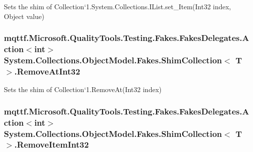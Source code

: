 Sets the shim of Collection`1.System.\-Collections.\-I\-List.\-set\-\_\-\-Item(\-Int32 index, Object value)

\hypertarget{class_system_1_1_collections_1_1_object_model_1_1_fakes_1_1_shim_collection_3_01_t_01_4_a9dd09b8943ad528b18131c8c9b4e5233}{
\subsubsection[{Remove\-At\-Int32}]{\setlength{\rightskip}{0pt plus 5cm}mqttf.\-Microsoft.\-Quality\-Tools.\-Testing.\-Fakes.\-Fakes\-Delegates.\-Action$<$int$>$ System.\-Collections.\-Object\-Model.\-Fakes.\-Shim\-Collection$<$ T $>$.Remove\-At\-Int32\hspace{0.3cm}{\ttfamily [set]}}}\label{class_system_1_1_collections_1_1_object_model_1_1_fakes_1_1_shim_collection_3_01_t_01_4_a9dd09b8943ad528b18131c8c9b4e5233}


Sets the shim of Collection`1.Remove\-At(\-Int32 index)

\hypertarget{class_system_1_1_collections_1_1_object_model_1_1_fakes_1_1_shim_collection_3_01_t_01_4_a400eb171d8deaf9d1f1ec61c344d14de}{
\subsubsection[{Remove\-Item\-Int32}]{\setlength{\rightskip}{0pt plus 5cm}mqttf.\-Microsoft.\-Quality\-Tools.\-Testing.\-Fakes.\-Fakes\-Delegates.\-Action$<$int$>$ System.\-Collections.\-Object\-Model.\-Fakes.\-Shim\-Collection$<$ T $>$.Remove\-Item\-Int32\hspace{0.3cm}{\ttfamily [set]}}}\label{class_system_1_1_collections_1_1_object_model_1_1_fakes_1_1_shim_collection_3_01_t_01_4_a400eb171d8deaf9d1f1ec61c344d14de}



